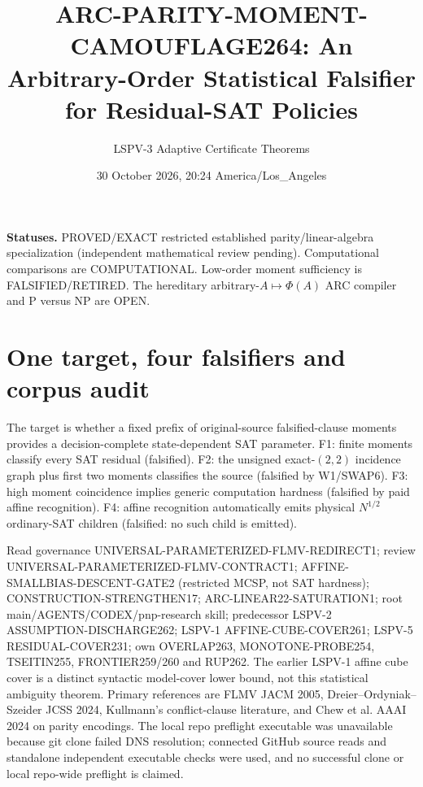 \documentclass[11pt]{article}
\title{ARC-PARITY-MOMENT-CAMOUFLAGE264: An Arbitrary-Order Statistical Falsifier for Residual-SAT Policies}
\author{LSPV-3 Adaptive Certificate Theorems}
\date{30 October 2026, 20:24 America/Los\_Angeles}
\begin{document}
\maketitle
\noindent\textbf{Statuses.} PROVED/EXACT restricted established parity/linear-algebra specialization (independent mathematical review pending). Computational comparisons are COMPUTATIONAL. Low-order moment sufficiency is FALSIFIED/RETIRED. The hereditary arbitrary-$A\mapsto\Phi(A)$ ARC compiler and P versus NP are OPEN.

\section{One target, four falsifiers and corpus audit}
The target is whether a fixed prefix of original-source falsified-clause moments provides a decision-complete state-dependent SAT parameter. F1: finite moments classify every SAT residual (falsified). F2: the unsigned exact-$(2,2)$ incidence graph plus first two moments classifies the source (falsified by W1/SWAP6). F3: high moment coincidence implies generic computation hardness (falsified by paid affine recognition). F4: affine recognition automatically emits physical $N^{1/2}$ ordinary-SAT children (falsified: no such child is emitted).

Read governance UNIVERSAL-PARAMETERIZED-FLMV-REDIRECT1; review UNIVERSAL-PARAMETERIZED-FLMV-CONTRACT1; AFFINE-SMALLBIAS-DESCENT-GATE2 (restricted MCSP, not SAT hardness); CONSTRUCTION-STRENGTHEN17; ARC-LINEAR22-SATURATION1; root main/AGENTS/CODEX/pnp-research skill; predecessor LSPV-2 ASSUMPTION-DISCHARGE262; LSPV-1 AFFINE-CUBE-COVER261; LSPV-5 RESIDUAL-COVER231; own OVERLAP263, MONOTONE-PROBE254, TSEITIN255, FRONTIER259/260 and RUP262. The earlier LSPV-1 affine cube cover is a distinct syntactic model-cover lower bound, not this statistical ambiguity theorem. Primary references are FLMV JACM 2005, Dreier--Ordyniak--Szeider JCSS 2024, Kullmann's conflict-clause literature, and Chew et al. AAAI 2024 on parity encodings. The local repo preflight executable was unavailable because git clone failed DNS resolution; connected GitHub source reads and standalone independent executable checks were used, and no successful clone or local repo-wide preflight is claimed.
\end{document}
